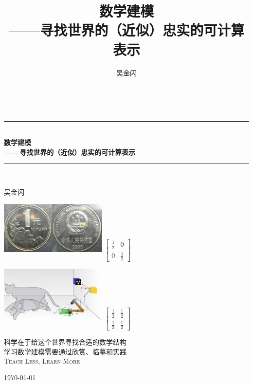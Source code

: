 \documentclass{ctexbook}
\newcommand{\HRule}{\rule{\linewidth}{0.5mm}}
\begin{document}
\title{数学建模\\
——寻找世界的（近似）忠实的可计算表示}
\author{吴金闪}

\begin{titlepage}
\begin{center}

~

\HRule \\[0.4cm]
{ \huge \bfseries 数学建模\\
——寻找世界的（近似）忠实的可计算表示 \\[0.4cm] }
\HRule \\[0.5cm]

\begin{center} \Large
吴金闪
\end{center}
\vspace{1cm}
	
\includegraphics[width=0.4\textwidth]{figure/coin} \hspace{2cm} $\begin{bmatrix}\frac{1}{2} & 0 \\
0 & \frac{1}{2} \end{bmatrix}$

\includegraphics[width=0.4\textwidth]{figure/schrodingerscat} \hspace{2cm} $\begin{bmatrix}\frac{1}{2} & \frac{1}{2} \\
\frac{1}{2} & \frac{1}{2}\end{bmatrix}$

\vspace{1cm}

\textsc{\Large 科学在于给这个世界寻找合适的数学结构}\\[0.5cm]

\textsc{\Large 学习数学建模需要通过欣赏、临摹和实践}\\[0.5cm]
	
\textsc{\Large Teach Less, Learn More}\\[0.5cm]
	
\vfill

{\large \today}

\end{center}
\end{titlepage}
\end{document}
